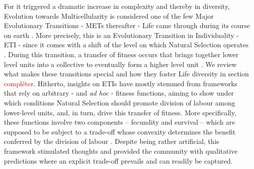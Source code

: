 For it triggered a dramatic increase in complexity and thereby in diversity, Evolution towards Multicellularity is considered one of the few Major Evolutionary Transitions - METs thereafter - Life came through during its course on earth \citep{Szathmary95,Szathmary15}. More precisely, this is an Evolutionary Transition in Individuality \citep{Michod96,Michod97,West15} - ETI - since it comes with a shift of the level on which Natural Selection operates \citep{Buss87}. During this transition, a transfer of fitness occurs that brings together lower level units into a collective to eventually form a higher level unit \citep{Okasha05,Bourrat15}. We review what makes these transitions special and how they foster Life diversity in section \textcolor{red}{compléter}. Hitherto, insights on ETIs have mostly stemmed from frameworks that rely on arbitrary - and \textit{ad hoc} - fitness functions, aiming to show under which conditions Natural Selection should promote division of labour among lower-level units, and, in turn, drive this transfer of fitness. More specifically, these functions involve two components -- fecundity and survival -- which are supposed to be subject to a trade-off whose convexity determines the benefit conferred by the division of labour \citep{Michod97,Michod05,Rueffler12,Nedelcu12}. Despite being rather artificial, this framework stimulated thoughts and provided the community with qualitative predictions where an explicit trade-off prevails and can readily be captured.

